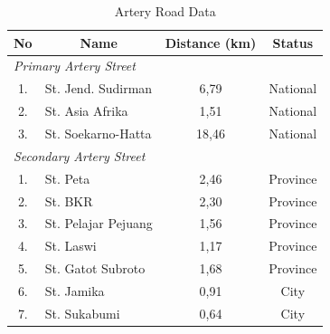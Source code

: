 \begin{table}[H] 
\centering
\begin{tabular}{|c|c|c|c|}
\hline
\rowcolor{gray}
\textbf{No} & \textbf{Name} & \textbf{Distance (km)} & \textbf{Status} \\
\hline
\multicolumn{2}{|l|}{\textit{Primary Artery Street}} &  & \\
\cline{1-4}
1. & \multicolumn{1}{|l|}{St. Jend. Sudirman} & 6,79 & National \\
\cline{1-4}
2. & \multicolumn{1}{|l|}{St. Asia Afrika} & 1,51 & National \\
\cline{1-4}
3. & \multicolumn{1}{|l|}{St. Soekarno-Hatta} & 18,46 & National \\

\cline{1-4}
\multicolumn{2}{|l|}{\textit{Secondary Artery Street}} &  & \\

\cline{1-4}
1. & \multicolumn{1}{|l|}{St. Peta} & 2,46 & Province \\
\cline{1-4}
2. & \multicolumn{1}{|l|}{St. BKR} & 2,30 & Province \\
\cline{1-4}
3. & \multicolumn{1}{|l|}{St. Pelajar Pejuang} & 1,56 & Province \\
\cline{1-4}
4. & \multicolumn{1}{|l|}{St. Laswi} & 1,17 & Province \\
\cline{1-4}
5. & \multicolumn{1}{|l|}{St. Gatot Subroto} & 1,68 & Province \\
\cline{1-4}
6. & \multicolumn{1}{|l|}{St. Jamika} & 0,91 & City \\
\cline{1-4}
7. & \multicolumn{1}{|l|}{St. Sukabumi} & 0,64 & City \\
\hline
\end{tabular}
\caption{Artery Road Data}
\label{table:street_data1}
\end{table}


